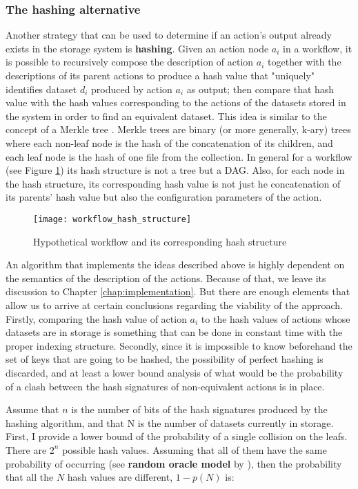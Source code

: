 \subsubsection{The hashing alternative}
\label{sec:encryption}
Another strategy that can be used to determine if an action's output already exists in the storage system is \textbf{hashing}.  Given an action node $a_i$ in a workflow, it is possible to recursively compose the description of action $a_i$ together with the descriptions of its parent actions to produce a hash value that "uniquely" identifies dataset $d_i$ produced by action $a_i$ as output; then compare that hash value with the hash values corresponding to the actions of the datasets stored in the system in order to find an equivalent dataset. This idea is similar to the concept of a Merkle tree \citep{merkle1990certified}. Merkle trees are binary (or more generally, k-ary) trees where each non-leaf node is the hash of the concatenation of its children, and each leaf node is the hash of one file from the collection.  In general for a workflow (see Figure \ref{fig:hash_structure}) its hash structure is not a tree but a DAG.  Also, for each node in the hash structure, its corresponding hash value is not just he concatenation of its parents' hash value but also the configuration parameters of the action.

\begin{figure}
\centering
\texttt{[image: workflow\_hash\_structure]}
\caption{Hypothetical workflow and its corresponding hash structure}
\label{fig:hash_structure}
\end{figure}

An algorithm that implements the ideas described above is highly dependent on the semantics of the description of the actions.  Because of that, we leave its discussion to Chapter \ref{chap:implementation}.  But there are enough elements that allow us to arrive at certain conclusions regarding the viability of the approach.  Firstly, comparing the hash value of action $a_i$ to the hash values of actions whose datasets are in storage is something that can be done in constant time with the proper indexing structure.  Secondly, since it is impossible to know beforehand the set of keys that are going to be hashed, the possibility of perfect hashing is discarded, and at least a lower bound analysis of what would be the probability of a clash between the hash signatures of non-equivalent actions is in place.  

Assume that $n$ is the number of bits of the hash signatures produced by the hashing algorithm, and that N is the number of datasets currently in storage.  First, I provide a lower bound of the probability of a single collision on the leafs. There are $2^n$ possible hash values.  Assuming that all of them have the same probability of occurring (see \textbf{random oracle model} by \cite{bellare1993random}), then the probability that all the $N$ hash values are different, $1 - p(N)$ is:

